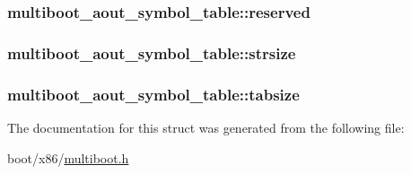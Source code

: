 \subsubsection[{reserved}]{ multiboot\+\_\+aout\+\_\+symbol\+\_\+table\+::reserved}\label{structmultiboot__aout__symbol__table_a2317e4e566e417b8fb3502074e0807d7}
\hypertarget{structmultiboot__aout__symbol__table_af9876cbe1b37935ed039c855f04b760e}{}
\subsubsection[{strsize}]{ multiboot\+\_\+aout\+\_\+symbol\+\_\+table\+::strsize}\label{structmultiboot__aout__symbol__table_af9876cbe1b37935ed039c855f04b760e}
\hypertarget{structmultiboot__aout__symbol__table_a3c9cc58c068678c095a7695f74375ca2}{}
\subsubsection[{tabsize}]{ multiboot\+\_\+aout\+\_\+symbol\+\_\+table\+::tabsize}\label{structmultiboot__aout__symbol__table_a3c9cc58c068678c095a7695f74375ca2}


The documentation for this struct was generated from the following file\+:\begin{DoxyCompactItemize}
\item 
boot/x86/\hyperlink{multiboot_8h}{multiboot.\+h}\end{DoxyCompactItemize}
